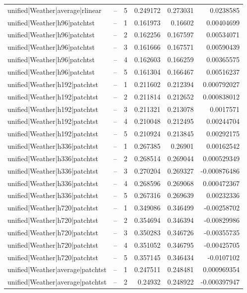 \begin{longtable}{llrrrr}
unified|Weather|average|rlinear & -- & 5 & 0.249172 & 0.273031 & 0.0238585 \\
unified|Weather|h96|patchtst & -- & 1 & 0.161973 & 0.16602 & 0.00404699 \\
unified|Weather|h96|patchtst & -- & 2 & 0.162256 & 0.167597 & 0.00534071 \\
unified|Weather|h96|patchtst & -- & 3 & 0.161666 & 0.167571 & 0.00590439 \\
unified|Weather|h96|patchtst & -- & 4 & 0.162603 & 0.166259 & 0.00365575 \\
unified|Weather|h96|patchtst & -- & 5 & 0.161304 & 0.166467 & 0.00516237 \\
unified|Weather|h192|patchtst & -- & 1 & 0.211602 & 0.212394 & 0.000792027 \\
unified|Weather|h192|patchtst & -- & 2 & 0.211814 & 0.212652 & 0.000838012 \\
unified|Weather|h192|patchtst & -- & 3 & 0.211321 & 0.213078 & 0.0017571 \\
unified|Weather|h192|patchtst & -- & 4 & 0.210048 & 0.212495 & 0.00244704 \\
unified|Weather|h192|patchtst & -- & 5 & 0.210924 & 0.213845 & 0.00292175 \\
unified|Weather|h336|patchtst & -- & 1 & 0.267385 & 0.26901 & 0.00162542 \\
unified|Weather|h336|patchtst & -- & 2 & 0.268514 & 0.269044 & 0.000529349 \\
unified|Weather|h336|patchtst & -- & 3 & 0.270204 & 0.269327 & -0.000876486 \\
unified|Weather|h336|patchtst & -- & 4 & 0.268596 & 0.269068 & 0.000472367 \\
unified|Weather|h336|patchtst & -- & 5 & 0.267316 & 0.269639 & 0.00232336 \\
unified|Weather|h720|patchtst & -- & 1 & 0.349086 & 0.346499 & -0.00258702 \\
unified|Weather|h720|patchtst & -- & 2 & 0.354694 & 0.346394 & -0.00829986 \\
unified|Weather|h720|patchtst & -- & 3 & 0.350283 & 0.346726 & -0.00355735 \\
unified|Weather|h720|patchtst & -- & 4 & 0.351052 & 0.346795 & -0.00425705 \\
unified|Weather|h720|patchtst & -- & 5 & 0.357145 & 0.346434 & -0.0107102 \\
unified|Weather|average|patchtst & -- & 1 & 0.247511 & 0.248481 & 0.000969354 \\
unified|Weather|average|patchtst & -- & 2 & 0.24932 & 0.248922 & -0.000397947 \\

\end{longtable}
